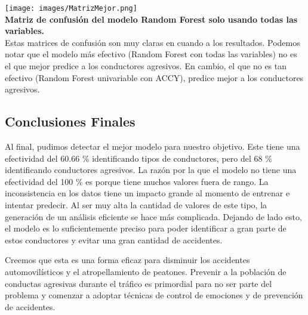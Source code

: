 \documentclass{article}
\begin{document}
        \texttt{[image: images/MatrizMejor.png]} \\

        \textbf{Matriz de confusión del modelo Random Forest solo usando todas las variables.} \\

Estas matrices de confusión son muy claras en cuando a los resultados. Podemos notar que el modelo más efectivo (Random Forest con todas las variables) no es el que mejor predice a los conductores agresivos. En cambio, el que no es tan efectivo (Random Forest univariable con ACCY), predice mejor a los conductores agresivos.

    \subsection{Conclusiones Finales}
            
            Al final, pudimos detectar el mejor modelo para nuestro objetivo. Este tiene una efectividad del 60.66 \% identificando tipos de conductores, pero del 68 \% identificando conductores agresivos. La razón por la que el modelo no tiene una efectividad del 100 \% es porque tiene muchos valores fuera de rango. La inconsistencia en los datos tiene un impacto grande al momento de entrenar e intentar predecir. Al ser muy alta la cantidad de valores de este tipo, la generación de un análisis eficiente se hace más complicada. Dejando de lado esto, el modelo es lo suficientemente preciso para poder identificar a gran parte de estos conductores y evitar una gran cantidad de accidentes. 

            Creemos que esta es una forma eficaz para disminuir los accidentes automovilísticos y el atropellamiento de peatones. Prevenir a la población de conductas agresivas durante el tráfico es primordial para no ser parte del problema y comenzar a adoptar técnicas de control de emociones y de prevención de accidentes.
\end{document}
